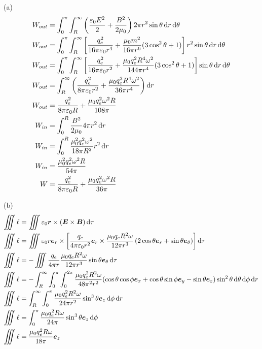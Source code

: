 (a)\begin{align*}
    W_{out}&=\int_{0}^{\pi}\int_{R}^{\infty}\left(\frac{\varepsilon_0E^2}{2}+\frac{B^2}{2\mu_0}\right)2\pi r^2\sin\theta\dif r\dif\theta\\
    W_{out}&=\int_{0}^{\pi}\int_{R}^{\infty}\left[\frac{q_e^2}{16\pi\varepsilon_0 r^4}+\frac{\mu_0m^2}{16\pi r^6}(3\cos^2\theta+1)\right]r^2\sin\theta\dif r\dif\theta\\
    W_{out}&=\int_{0}^{\pi}\int_{R}^{\infty}\left[\frac{q_e^2}{16\pi\varepsilon_0 r^2}+\frac{\mu_0q_e^2R^4\omega^2}{144\pi r^4}(3\cos^2\theta+1)\right]\sin\theta\dif r\dif\theta\\
    W_{out}&=\int_{R}^{\infty}\left(\frac{q_e^2}{8\pi\varepsilon_0 r^2}+\frac{\mu_0q_e^2R^4\omega^2}{36\pi r^4}\right)\dif r\\
    W_{out}&=\frac{q_e^2}{8\pi\varepsilon_0 R}+\frac{\mu_0q_e^2\omega^2R}{108\pi}\\
    W_{in}&=\int_{0}^{R}\frac{B^2}{2\mu_0}4\pi r^2\dif r\\
    W_{in}&=\int_{0}^{R}\frac{\mu_0^2q_e^2\omega^2}{18\pi R^2}r^2\dif r\\
    W_{in}&=\frac{\mu_0^2q_e^2\omega^2R}{54\pi}\\
    W&=\frac{q_e^2}{8\pi\varepsilon_0 R}+\frac{\mu_0q_e^2\omega^2R}{36\pi}
\end{align*}

(b)\begin{align*}
    \iiint\ell&=\iiint\varepsilon_0\boldsymbol{r}\times(\boldsymbol E\times\boldsymbol B)\dif\tau\\
    \iiint\ell&=\iiint\varepsilon_0r\boldsymbol{e}_r\times\left[\frac{q_e}{4\pi\varepsilon_0r^2}\boldsymbol{e}_r\times\frac{\mu_0q_eR^2\omega}{12\pi r^3}\left(2\cos\theta\boldsymbol{e}_r+\sin\theta\boldsymbol{e}_\theta\right)\right]\dif\tau\\
    \iiint\ell&=-\iiint\frac{q_e}{4\pi r}\frac{\mu_0q_eR^2\omega}{12\pi r^3}\sin\theta\boldsymbol{e}_\theta\dif\tau\\
    \iiint\ell&=-\int_R^\infty\int_0^\pi\int_0^{2\pi}\frac{\mu_0q_e^2R^2\omega}{48\pi^2 r^2}(\cos\theta\cos\phi\boldsymbol{e}_x+\cos\theta\sin\phi\boldsymbol{e}_y-\sin\theta\boldsymbol{e}_z)\sin^2\theta\dif\theta\dif\phi\dif r\\
    \iiint\ell&=\int_R^\infty\int_0^\pi\frac{\mu_0q_e^2R^2\omega}{24\pi r^2}\sin^3\theta\boldsymbol{e}_z\dif\phi\dif r\\
    \iiint\ell&=\int_0^\pi\frac{\mu_0q_e^2R\omega}{24\pi}\sin^3\theta\boldsymbol{e}_z\dif\phi\\
    \iiint\ell&=\frac{\mu_0q_e^2R\omega}{18\pi}\boldsymbol{e}_z
\end{align*}

